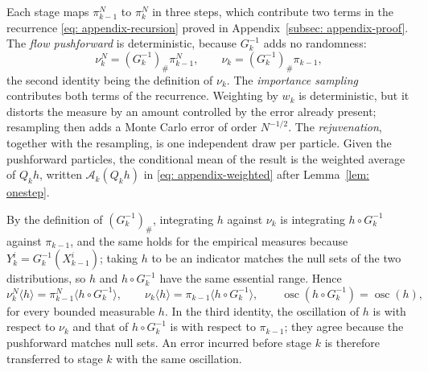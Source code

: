 \documentclass{article}
\begin{document}
Each stage maps $\pi_{k-1}^N$ to $\pi_k^N$ in three steps, which contribute two terms in the recurrence \eqref{eq: appendix-recursion} proved in Appendix~\ref{subsec: appendix-proof}. The \emph{flow pushforward} is deterministic, because $G_k^{-1}$ adds no randomness:
\begin{equation}
    \nu_k^N = (G_k^{-1})_{\#}\pi_{k-1}^N ,
    \qquad
    \nu_k = (G_k^{-1})_{\#}\pi_{k-1} ,
    \label{eq: appendix-pushforward}
\end{equation}
the second identity being the definition of $\nu_k$. The \emph{importance sampling} contributes both terms of the recurrence. Weighting by $w_k$ is deterministic, but it distorts the measure by an amount controlled by the error already present; resampling then adds a Monte Carlo error of order $N^{-1/2}$. The \emph{rejuvenation}, together with the resampling, is one independent draw per particle. Given the pushforward particles, the conditional mean of the result is the weighted average of $Q_kh$, written $\mathcal A_k(Q_kh)$ in \eqref{eq: appendix-weighted} after Lemma~\ref{lem: onestep}.

By the definition of $(G_k^{-1})_{\#}$, integrating $h$ against $\nu_k$ is integrating $h\circ G_k^{-1}$ against $\pi_{k-1}$, and the same holds for the empirical measures because $Y_k^i=G_k^{-1}(X_{k-1}^i)$; taking $h$ to be an indicator matches the null sets of the two distributions, so $h$ and $h\circ G_k^{-1}$ have the same essential range. Hence
\begin{equation}
    \nu_k^N\langle h\rangle = \pi_{k-1}^N\langle h\circ G_k^{-1}\rangle,
    \qquad
    \nu_k\langle h\rangle = \pi_{k-1}\langle h\circ G_k^{-1}\rangle,
    \qquad
    \operatorname{osc}(h\circ G_k^{-1}) = \operatorname{osc}(h) ,
    \label{eq: appendix-transfer}
\end{equation}
for every bounded measurable $h$. In the third identity, the oscillation of $h$ is with respect to $\nu_k$ and that of $h\circ G_k^{-1}$ is with respect to $\pi_{k-1}$; they agree because the pushforward matches null sets. An error incurred before stage $k$ is therefore transferred to stage $k$ with the same oscillation.
\end{document}
